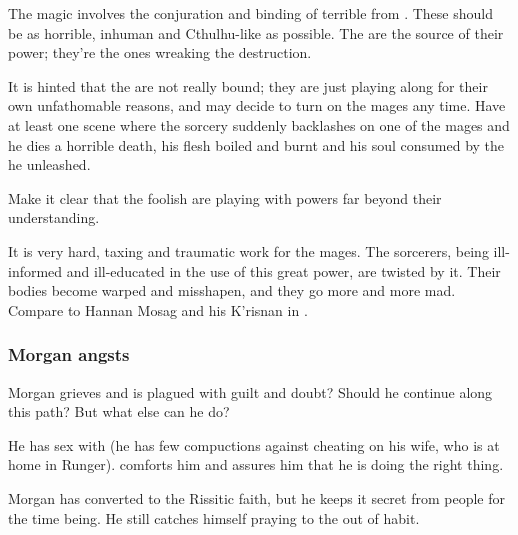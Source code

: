The magic involves the conjuration and binding of terrible \daemons{} from \Chaos. These should be as horrible, inhuman and Cthulhu-like as possible. The \daemons{} are the source of their power; they're the ones wreaking the destruction. 

It is hinted that the \daemons{} are not really bound; they are just playing along for their own unfathomable reasons, and may decide to turn on the mages any time. Have at least one scene where the sorcery suddenly backlashes on one of the mages and he dies a horrible death, his flesh boiled and burnt and his soul consumed by the \daemon{} he unleashed. 

Make it clear that the foolish \humans{} are playing with powers far beyond their understanding. 

It is very hard, taxing and traumatic work for the mages. The sorcerers, being ill-informed and ill-educated in the use of this great power, are twisted by it. Their bodies become warped and misshapen, and they go more and more mad. Compare to Hannan Mosag and his K'risnan in \cite{StevenEriksonIanCameronEsslemont:MalazanBookoftheFallen}.







\subsubsection{Morgan angsts}
Morgan grieves and is plagued with guilt and doubt? Should he continue along this path? But what else can he do? 

He has sex with \Takestsha{} (he has few compuctions against cheating on his wife, who is at home in Runger). \Takestsha{} comforts him and assures him that he is doing the right thing. 

Morgan has converted to the Rissitic faith, but he keeps it secret from people for the time being. He still catches himself praying to the \Sephiroth{} out of habit. 






